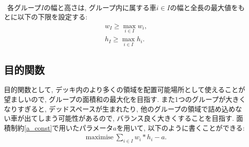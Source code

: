 \\
\ 各グループ$I$の幅と高さは, グループ内に属する車$i \in I$の幅と全長の最大値をもとに以下の下限を設定する: \\
\begin{eqnarray}
    w_I \geq \max_{i \in I} w_i, \\
    h_I \geq \max_{i \in I} h_i. 
\end{eqnarray}


\subsection{目的関数}
目的関数として, デッキ内のより多くの領域を配置可能場所として使えることが望ましいので, グループの面積和の最大化を目指す. 
また1つのグループが大きくなりすぎると, デッドスペースが生まれたり, 他のグループの領域で詰め込めない車が出てしまう可能性があるので, バランス良く大きくすることを目指す. 
面積制約\ref{a_const}で用いたパラメータ$a$を用いて, 以下のように書くことができる: \\
\begin{eqnarray}
    \mathrm{maximise}\ \sum_{i \in I} w_i*h_i  - a. 
\end{eqnarray}
